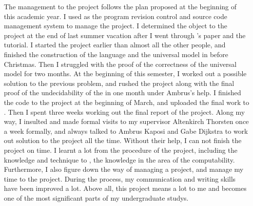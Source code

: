 The management to the project follows the plan proposed at the beginning of this academic year. 
I used  as the program revision control and source code management system to manage the project.
I determined the object to the project at the end of last summer vacation after I went through 's paper and the \Agda tutorial\cite{jones_computability_1997}\cite{norell_dependently_2009}.
I started the project earlier than almost all the other people, and finished the construction of the \WHILE language and the universal \WHILE model in \Agda before Christmas.
Then I struggled with the proof of the correctness of the universal \WHILE model for two months.
At the beginning of this semester, I worked out a possible solution to the previous problem, and rushed the project along with the final proof of the undecidability of the  in one month under Ambrus's help.
I finished the code to the project at the beginning of March, and uploaded the final work to .
Then I spent three weeks working out the final report of the project.
Along my way, I insulted and made formal visits to my supervisor Altenkirch Thorsten once a week formally, and always talked to Ambrus Kaposi and Gabe Dijkstra to work out solution to the project all the time.
Without their help, I can not finish the project on time.
I learnt a lot from the procedure of the project, including the knowledge and technique to , the knowledge in the area of the computability.
Furthermore, I also figure down the way of managing a project, and manage my time to the project.
During the process, my communication and writing skills have been improved a lot. 
Above all, this project means a lot to me and becomes one of the most significant parts of my undergraduate studys.

